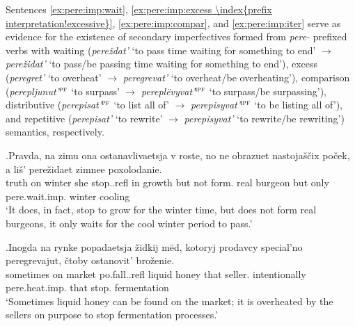 Sentences \ref{ex:pere:imp:wait}, \ref{ex:pere:imp:excess \index{prefix interpretation!excessive}}, \ref{ex:pere:imp:compar}, and \ref{ex:pere:imp:iter} serve as evidence for the existence of secondary imperfectives  formed from \textit{pere-}  prefixed verbs with waiting (\textit{pere\v{z}dat'} `to pass time waiting for something to end' $\rightarrow$ \textit{pere\v{z}idat'}  `to pass/be passing time waiting for something to end'), excess  (\textit{peregret'} `to overheat' $\rightarrow$ \textit{peregrevat'} `to overheat/be overheating'), comparison  (\textit{perepljunut'$^{\textsc{pf}}$} `to surpass' $\rightarrow$ \textit{perepl\"{e}vyvat'$^{\textsc{ipf}}$} `to surpass/be surpassing'), distributive  (\textit{perepisat'$^{\textsc{pf}}$} `to list all of' $\rightarrow$ \textit{perepisyvat'$^{\textsc{ipf}}$} `to be listing all of'), and repetitive  (\textit{perepisat'} `to rewrite' $\rightarrow$ \textit{perepisyvat'} `to rewrite/be rewriting') semantics, respectively.

\exg.\label{ex:pere:imp:wait}Pravda, na zimu ona ostanavlivaetsja v roste, no ne obrazuet nastoja\v{s}\v{c}ix po\v{c}ek, a li\v{s}' pere\v{z}idaet zimnee poxolodanie.\\
truth on winter she stop..refl in growth but not form. real burgeon but only pere.wait.imp. winter cooling\\
\trans `It does, in fact, stop to grow for the winter time, but does not form real burgeons, it only waits for the cool winter period to pass.'\\

\exg.\label{ex:pere:imp:excess \index{prefix interpretation!excessive}}Inogda na rynke popadaetsja \v{z}idkij m\"{e}d, kotoryj prodavcy special'no peregrevajut, \v{c}toby ostanovit' bro\v{z}enie.\\
sometimes on market po.fall..refl liquid honey that seller. intentionally pere.heat.imp. that stop. fermentation\\
`Sometimes liquid honey can be found on the market; it is overheated by the sellers on purpose to stop fermentation processes.'\\

